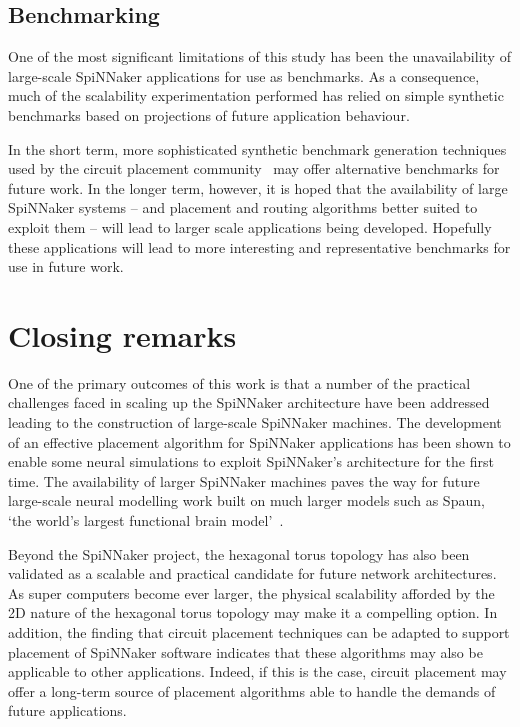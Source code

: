 		\subsection{Benchmarking}
			
			One of the most significant limitations of this study has been the
			unavailability of large-scale SpiNNaker applications for use as
			benchmarks. As a consequence, much of the scalability experimentation
			performed has relied on simple synthetic benchmarks based on projections
			of future application behaviour.
			
			In the short term, more sophisticated synthetic benchmark generation
			techniques used by the circuit placement community~\cite{nam07} may offer
			alternative benchmarks for future work. In the longer term, however, it
			is hoped that the availability of large SpiNNaker systems -- and
			placement and routing algorithms better suited to exploit them -- will
			lead to larger scale applications being developed. Hopefully these
			applications will lead to more interesting and representative benchmarks
			for use in future work.
	
	\section{Closing remarks}
		
		One of the primary outcomes of this work is that a number of the practical
		challenges faced in scaling up the SpiNNaker architecture have been
		addressed leading to the construction of large-scale SpiNNaker machines.
		The development of an effective placement algorithm for SpiNNaker
		applications has been shown to enable some neural simulations to exploit
		SpiNNaker's architecture for the first time. The availability of larger
		SpiNNaker machines paves the way for future large-scale neural modelling
		work built on much larger models such as Spaun, `the world's largest
		functional brain model'~\cite{eliasmith12}.
		
		Beyond the SpiNNaker project, the hexagonal torus topology has also been
		validated as a scalable and practical candidate for future network
		architectures. As super computers become ever larger, the physical
		scalability afforded by the 2D nature of the hexagonal torus topology may
		make it a compelling option. In addition, the finding that circuit
		placement techniques can be adapted to support placement of SpiNNaker
		software indicates that these algorithms may also be applicable to other
		applications. Indeed, if this is the case, circuit placement may offer a
		long-term source of placement algorithms able to handle the demands of
		future applications.
		
